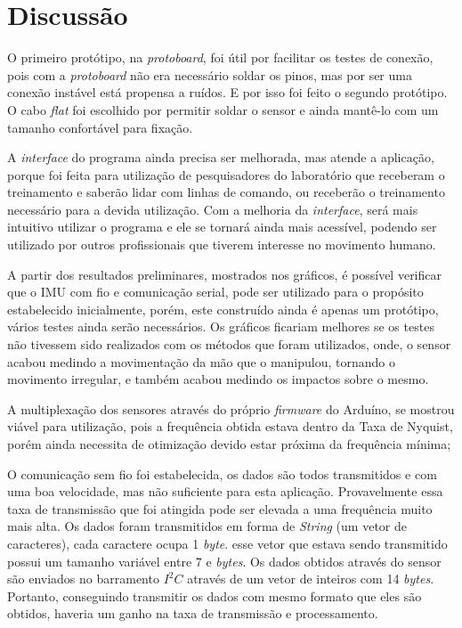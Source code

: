 	\section{Discussão}		

	O primeiro protótipo, na \textit{protoboard}, foi útil por facilitar os testes de conexão, pois com a \textit{protoboard} não era necessário soldar os pinos, mas por ser uma conexão instável está propensa a ruídos. E por isso foi feito o segundo protótipo. O cabo \textit{flat} foi escolhido por permitir soldar o sensor e ainda mantê-lo com um tamanho confortável para fixação.
	
	A \textit{interface} do programa ainda precisa ser melhorada, mas atende a aplicação, porque foi feita para utilização de pesquisadores do laboratório que receberam o treinamento e saberão lidar com linhas de comando, ou receberão o treinamento necessário para a devida utilização. Com a melhoria da \textit{interface}, será mais intuitivo utilizar o programa e ele se tornará ainda mais acessível, podendo ser utilizado por outros profissionais que tiverem interesse no movimento humano.
	
	 A partir dos resultados preliminares, mostrados nos gráficos, é possível verificar que o IMU com fio e comunicação serial, pode ser utilizado  para o propósito estabelecido inicialmente, porém, este construído ainda é apenas um protótipo, vários testes ainda serão necessários. Os gráficos ficariam melhores se os testes não tivessem sido realizados com os métodos que foram utilizados, onde, o sensor acabou medindo a movimentação da mão que o manipulou, tornando o movimento irregular, e também acabou medindo os impactos sobre o mesmo.
	
	A multiplexação dos sensores através do próprio \textit{firmware} do Arduíno, se mostrou viável para utilização, pois a frequência obtida estava dentro da Taxa de Nyquist, porém ainda necessita de otimização devido estar próxima da frequência mínima;
	
	O comunicação sem fio foi estabelecida, os dados são todos transmitidos e com uma boa velocidade, mas não suficiente para esta aplicação.  Provavelmente essa taxa de transmissão que foi atingida pode ser elevada a uma frequência muito mais alta. Os dados foram transmitidos em forma de \textit{String} (um vetor de caracteres), cada caractere ocupa 1 \textit{byte}. esse vetor que estava sendo transmitido possui um tamanho variável entre 7 e \textit{ bytes}. Os dados obtidos através do sensor são enviados no barramento $I^2C$ através de um vetor de inteiros com 14 \textit{bytes}. Portanto, conseguindo transmitir os dados com mesmo formato que eles são obtidos, haveria um ganho na taxa de transmissão e processamento.
	
